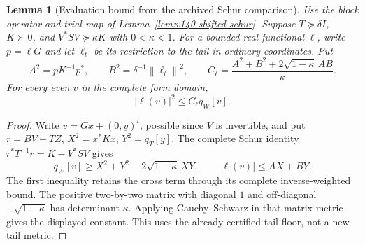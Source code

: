 \documentclass[11pt]{article}
\newtheorem{lemma}[theorem]{Lemma}
\theoremstyle{remark}
\newcommand{\norm}[1]{\left\lVert #1\right\rVert}
\begin{document}
\begin{lemma}[Evaluation bound from the archived Schur comparison]
\label{lem:v143-evaluator-dual}
Use the block operator and trial map of
Lemma~\ref{lem:v140-shifted-schur}. Suppose $T\succeq\delta I$,
$K\succ0$, and $V^*SV\succeq\kappa K$ with $0<\kappa<1$.
For a bounded real functional $\ell$, write $p=\ell G$ and let
$\ell_t$ be its restriction to the tail in ordinary coordinates. Put
\[
 A^2=pK^{-1}p^*,\qquad B^2=\delta^{-1}\norm{\ell_t}^2,
 \qquad
 C_\ell=\frac{A^2+B^2+2\sqrt{1-\kappa}\,AB}{\kappa}.
\]
For every even $v$ in the complete form domain,
\[
 |\ell(v)|^2\le C_\ell q_W[v].
\]
\end{lemma}
\begin{proof}
Write $v=Gx+(0,y)^t$, possible since $V$ is invertible, and put
$r=BV+TZ$, $X^2=x^*Kx$, $Y^2=q_T[y]$. The complete Schur identity
$r^*T^{-1}r=K-V^*SV$ gives
\[
 q_W[v]\ge X^2+Y^2-2\sqrt{1-\kappa}\,XY,
 \qquad |\ell(v)|\le AX+BY.
\]
The first inequality retains the cross term through its complete
inverse-weighted bound. The positive two-by-two matrix with diagonal
$1$ and off-diagonal $-\sqrt{1-\kappa}$ has determinant $\kappa$.
Applying Cauchy--Schwarz in that matrix metric gives the displayed
constant. This uses the already certified tail floor, not a new tail metric.
\end{proof}
\end{document}
